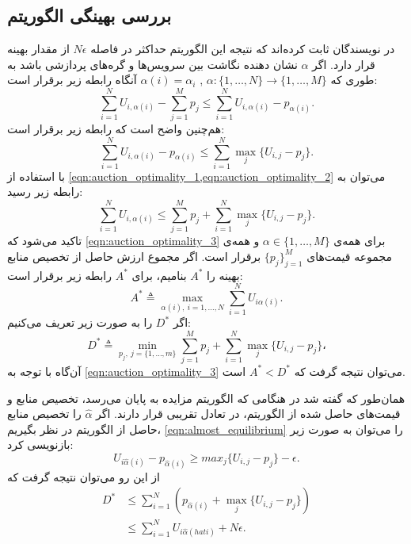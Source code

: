     \subsection{بررسی بهینگی الگوریتم}
      در \cite{distributed_auction_algorithms_zavlanos} نویسندگان ثابت کرده‌اند که نتیجه این الگوریتم حداکثر در فاصله $N\epsilon$ از مقدار بهینه قرار دارد.
      اگر $\alpha$ نشان دهنده نگاشت بین سرویس‌ها و گره‌های پردازشی باشد به طوری که $\alpha: \{1, \hdots, N\} \rightarrow \{1, \hdots, M\}$ , $\alpha(i) = \alpha_i$ آنگاه رابطه زیر برقرار است:
      \begin{equation}\label{eqn:auction_optimality_1}
        \sum_{i=1}^N U_{i,\alpha(i)} - \sum_{j=1}^M p_j \le \sum_{i=1}^N U_{i,\alpha(i)} - p_{\alpha(i)}.
      \end{equation}
      هم‌چنین واضح است که رابطه زیر برقرار است:
      \begin{equation}\label{eqn:auction_optimality_2}
        \sum_{i=1}^N U_{i,\alpha(i)} - p_{\alpha(i)} \le \sum_{i=1}^N \max_j\{U_{i,j} - p_j\}.
      \end{equation}
      با استفاده از \cref{eqn:auction_optimality_1,eqn:auction_optimality_2} می‌توان به رابطه زیر رسید:
      \begin{equation}\label{eqn:auction_optimality_3}
        \sum_{i=1}^N U_{i,\alpha(i)} \le \sum_{j=1}^M p_j + \sum_{i=1}^N \max_j\{U_{i,j} - p_j\}.
      \end{equation}
      تاکید می‌شود که \cref{eqn:auction_optimality_3} برای همه‌ی $\alpha \in \{1,\hdots,M\}$ و همه‌ی مجموعه قیمت‌های $\{p_j\}_{j=1}^M$ برقرار است.
      اگر مجموع ارزش حاصل از تخصیص منابع بهینه را $A^*$ بنامیم، برای $A^*$ رابطه زیر برقرار است:
      \begin{equation}\label{eqn:auction_optimality_A_defenition}
        A^* \triangleq \max_{\alpha(i),~i=1, \hdots, N} \sum_{i=1}^N U_{i\alpha(i)}.
      \end{equation}
      اگر $D^*$ را به صورت زیر تعریف می‌کنیم:
      \begin{equation}\label{eqn:auction_optimality_D_defenition}
        D^* \triangleq \min_{p_j,~j=\{1, \hdots, m\}} \sum_{j=1}^M p_j + \sum_{i=1}^N \max_j\{U_{i,j} - p_j\}،
      \end{equation}
      آن‌گاه با توجه به \cref{eqn:auction_optimality_3} می‌توان نتیجه گرفت که $A^*<D^*$ است.
      
      همان‌طور که گفته شد در هنگامی که الگوریتم مزایده به پایان می‌رسد، تخصیص منابع و قیمت‌های حاصل شده از الگوریتم، در تعادل تقریبی قرار دارند.
      اگر $\hat \alpha$ را تخصیص منابع حاصل از الگوریتم در نظر بگیریم، \cref{eqn:almost_equilibrium} را می‌توان به صورت زیر باز‌نویسی کرد:
      \begin{equation}\label{eqn:auction_almost_equilibrium2}
        U_{i \hat \alpha(i)} - p_{\hat \alpha(i)} \ge max_j \{U_{i,j}-p_j\}-\epsilon.
      \end{equation}
      از این رو می‌توان نتیجه گرفت که
      \begin{align}
        D^* & \le \sum_{i=1}^N \left(p_{\hat \alpha (i)}+\max_j\{U_{i,j}-p_j\}\right) \\
            & \le \sum_{i=1}^N U_{i \hat \alpha (hati)} + N \epsilon \label{eqn:auction_D_upper_bound}.
      \end{align}

